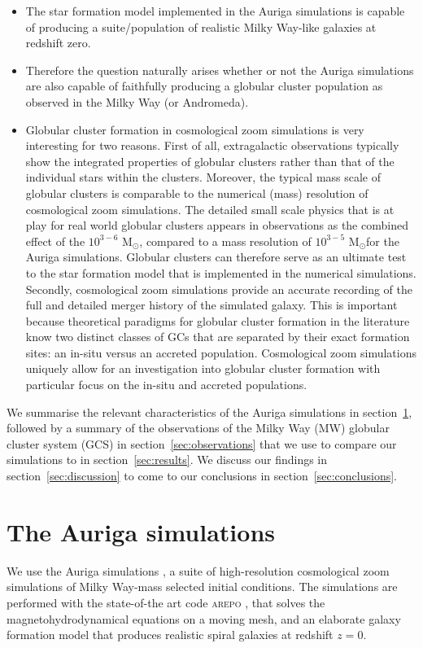 \documentclass[a4paper,fleqn,usenatbib]{mnras}
\newcommand{\Sun}[0]{\ensuremath{_{\odot}}}
\begin{document}
\begin{itemize}
    \item The star formation model implemented in the Auriga simulations is capable of producing a suite/population of realistic Milky Way-like galaxies at redshift zero.
    \item Therefore the question naturally arises whether or not the Auriga simulations are also capable of faithfully producing a globular cluster population as observed in the Milky Way (or Andromeda).
    \item Globular cluster formation in cosmological zoom simulations is very interesting for two reasons. First of all, extragalactic observations typically show the integrated properties of globular clusters rather than that of the individual stars within the clusters. Moreover, the typical mass scale of globular clusters is comparable to the numerical (mass) resolution of cosmological zoom simulations. The detailed small scale physics that is at play for real world globular clusters appears in observations as the combined effect of the $10^{3-6}$ M\Sun, compared to a mass resolution of $10^{3-5}$ M\Sun for the Auriga simulations. Globular clusters can therefore serve as an ultimate test to the star formation model that is implemented in the numerical simulations. Secondly, cosmological zoom simulations provide an accurate recording of the full and detailed merger history of the simulated galaxy. This is important because theoretical paradigms for globular cluster formation in the literature know two distinct classes of GCs that are separated by their exact formation sites: an in-situ versus an accreted population. Cosmological zoom simulations uniquely allow for an investigation into globular cluster formation with particular focus on the in-situ and accreted populations.
\end{itemize}


We summarise the relevant characteristics of the Auriga simulations in 
section~\ref{sec:auriga}, followed by a summary of the observations of the
Milky Way (MW) globular cluster system (GCS) in section~\ref{sec:observations}
that we use to compare our simulations to in section~\ref{sec:results}. We
discuss our findings in section~\ref{sec:discussion} to come to our conclusions 
in section~\ref{sec:conclusions}.


\section{The Auriga simulations}
\label{sec:auriga}
We use the Auriga simulations \citep[][hereafter G17]{2017MNRAS.467..179G}, a 
suite of high-resolution cosmological zoom simulations of Milky Way-mass 
selected initial conditions. The simulations are performed with the 
state-of-the art code \textsc{arepo} \citep{2010MNRAS.401..791S,
2016MNRAS.455.1134P}, that solves the magnetohydrodynamical equations on a 
moving mesh, and an elaborate galaxy formation model that produces realistic 
spiral galaxies at redshift $z=0$. 
\end{document}
